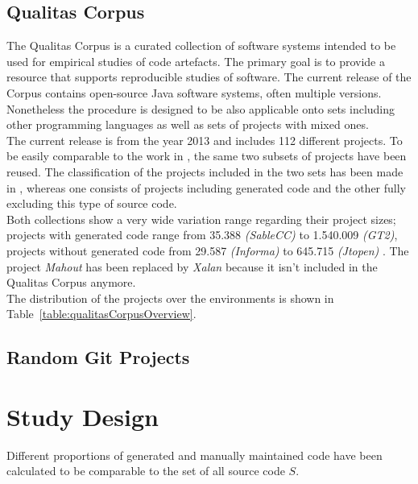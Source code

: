\subsection{Qualitas Corpus}
The Qualitas Corpus is a curated collection of software systems intended to be used for empirical studies of code artefacts. The primary goal is to provide a resource that supports reproducible studies of software. The current release of the Corpus contains open-source Java software systems, often multiple versions. \cite{Tempero2010}\\
Nonetheless the procedure is designed to be also applicable onto sets including other programming languages as well as sets of projects with mixed ones.\\
The current release is from the year 2013 and includes 112 different projects. To be easily comparable to the work in \cite{Bernwieser2014}, the same two subsets of projects have been reused. The classification of the projects included in the two sets has been made in \cite{Bernwieser2014}, whereas one consists of projects including generated code and the other fully excluding this type of source code.\\
Both collections show a very wide variation range regarding their project sizes; projects with generated code range from 35.388 \textit{(SableCC)} to 1.540.009 \textit{(GT2)}, projects without generated code from 29.587 \textit{(Informa)} to 645.715 \textit{(Jtopen)} \cite{Bernwieser2014}. 
The project \textit{Mahout} has been replaced by \textit{Xalan} because it isn't included in the Qualitas Corpus anymore.\\ 
The distribution of the projects over the environments is shown in Table~\ref{table:qualitasCorpusOverview}.

\subsection{Random Git Projects}

\section{Study Design}
Different proportions of generated and manually maintained code have been calculated to be comparable to the set of all source code $S$. 

